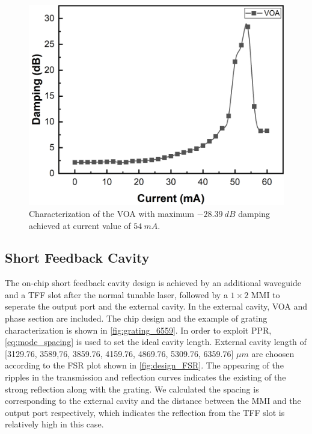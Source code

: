 
\begin{figure}[ht]
    \centering
    \includegraphics[width=0.55\linewidth]{figures/VOA_18321.png}
    \caption{Characterization of the VOA with maximum $-28.39 \ dB$ damping achieved at current value of $54 \ mA$.}
    \label{fig:VOA_18321}
\end{figure}

\subsection{Short Feedback Cavity} \label{subsec:short_feedback_cavity}
The on-chip short feedback cavity design is achieved by an additional waveguide and a TFF slot after the normal tunable laser, followed by a $1\times 2$ MMI to seperate the output port and the external cavity. In the external cavity, VOA and phase section are included. The chip design and the example of grating characterization is shown in \autoref{fig:grating_6559}. In order to exploit PPR, \autoref{eq:mode_spacing} is used to set the ideal cavity length. External cavity length of [3129.76, 3589,76, 3859.76, 4159.76, 4869.76, 5309.76, 6359.76] $\mu m$ are choosen according to the FSR plot shown in \autoref{fig:design_FSR}. The appearing of the ripples in the transmission and reflection curves indicates the existing of the strong reflection along with the grating. We calculated the spacing is corresponding to the external cavity and the distance between the MMI and the output port respectively, which indicates the reflection from the TFF slot is relatively high in this case.

